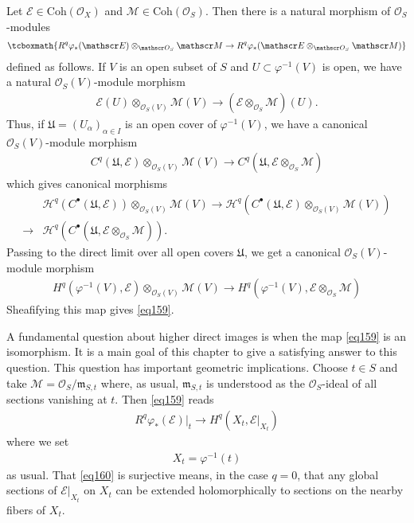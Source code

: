 \documentclass[12pt,b5paper,notitlepage]{report}
\theoremstyle{definition}
\theoremstyle{plain}
\newcommand{\fk}{\mathfrak}
\newcommand{\mc}{\mathcal}
\newcommand{\scr}{\mathscr}
\newcommand{\blt}{\bullet}
\newcommand{\mk}{\mathfrak m}
\newcommand{\Coh}{\mathrm{Coh}}
\numberwithin{equation}{section}
\begin{document}
Let $\scr E\in\Coh(\scr O_X)$ and $\scr M\in\Coh(\scr O_S)$. Then there is a natural morphism of $\scr O_S$-modules
\begin{align}
\tcboxmath{R^q\varphi_*(\scr E)\otimes_{\scr O_S}\scr M\rightarrow R^q\varphi_*(\scr E\otimes_{\scr O_S}\scr M)}   \label{eq159}
\end{align}
defined as follows. If $V$ is an open subset of $S$ and $U\subset\varphi^{-1}(V)$ is open, we have a natural $\scr O_S(V)$-module morphism
\begin{align*}
\scr E(U)\otimes_{\scr O_S(V)}\scr M(V)\rightarrow(\scr E\otimes_{\scr O_S}\scr M)(U).
\end{align*}
Thus, if $\fk U=(U_\alpha)_{\alpha\in I}$ is an open cover of $\varphi^{-1}(V)$, we have a canonical $\scr O_S(V)$-module morphism
\begin{align*}
C^q(\fk U,\scr E)\otimes_{\scr O_S(V)}\scr M(V)\rightarrow C^q(\fk U,\scr E\otimes_{\scr O_S}\scr M)
\end{align*}
which gives canonical morphisms
\begin{align*}
&\mc H^q(C^\blt(\fk U,\scr E))\otimes_{\scr O_S(V)}\scr M(V)\rightarrow \mc H^q(C^\blt(\fk U,\scr E)\otimes_{\scr O_S(V)}\scr M(V))\\
\rightarrow &\mc H^q(C^\blt(\fk U,\scr E\otimes_{\scr O_S}\scr M)).
\end{align*}
Passing to the direct limit over all open covers $\fk U$, we get a canonical $\scr O_S(V)$-module morphism
\begin{align*}
H^q(\varphi^{-1}(V),\scr E)\otimes_{\scr O_S(V)}\scr M(V)\rightarrow H^q(\varphi^{-1}(V),\scr E\otimes_{\scr O_S}\scr M)
\end{align*}
Sheafifying this map gives \eqref{eq159}.



A fundamental question about higher direct images is when the map \eqref{eq159} is an isomorphism. It is a main goal of this chapter to give a satisfying answer to this question. This question has important geometric implications. Choose $t\in S$ and take $\scr M=\scr O_S/\mk_{S,t}$ where, as usual, $\mk_{S,t}$ is understood as the $\scr O_S$-ideal of all sections vanishing at $t$. Then \eqref{eq159} reads
\begin{align}
R^q\varphi_*(\scr E)|_t\rightarrow H^q(X_t\scr,\scr E|_{X_t} )  \label{eq160}
\end{align}
where we set 
\begin{align*}
X_t=\varphi^{-1}(t)
\end{align*}
as usual. That \eqref{eq160} is surjective means, in the case $q=0$, that any global sections of $\scr E|_{X_t}$ on $X_t$ can be extended holomorphically to sections on the nearby fibers of $X_t$.
\end{document}
